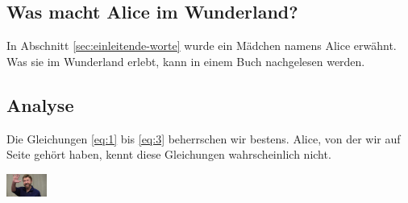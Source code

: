 \documentclass[11pt]{scrartcl}
\begin{document}
\subsection{Was macht Alice im Wunderland?}
\label{sec:was-macht-alice}

In Abschnitt \ref{sec:einleitende-worte} wurde ein Mädchen namens
Alice erwähnt. Was sie im Wunderland erlebt, kann in einem Buch
nachgelesen werden.
 
\subsection{Analyse}
\label{sec:analyse}

Die Gleichungen \eqref{eq:1} bis \eqref{eq:3} beherrschen wir bestens.
Alice, von der wir auf Seite \pageref{sec:einleitende-worte} gehört
haben, kennt diese Gleichungen wahrscheinlich nicht.

\begin{center}
  \includegraphics[width=0.1\textwidth]{chuck}
\end{center}
 
\end{document}
